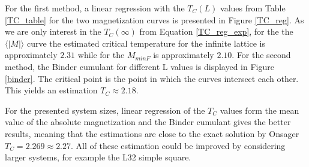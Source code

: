 	For the first method, a linear regression with the $T_C(L)$ values from Table \ref{TC_table} for the two magnetization curves is presented in Figure \ref{TC_reg}. As we are only interest in the $T_C(\infty)$ from Equation \ref{TC_reg_exp}, for the the $\langle |M| \rangle$ curve the estimated critical temperature for the infinite lattice is approximately $2.31$ while for the $M_{minF}$ is approximately $2.10$. 
	For the second method, the Binder cumulant for different L values is displayed in Figure \ref{binder}. The critical point is the point in which the curves intersect each other. This yields an estimation $T_C \approx 2.18$.
	
	For the presented system sizes, linear regression of the $T_C$ values form the mean value of the absolute magnetization and the Binder cumulant gives the better results, meaning that the estimations are close to the exact solution by Onsager $T_C=2.269\approx2.27$. All of these estimation could be improved by considering larger systems, for example the L32 simple square.
	
	
	









